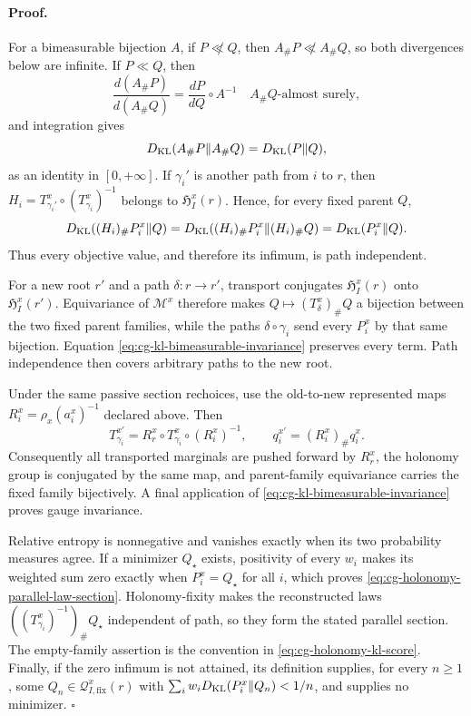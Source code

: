\paragraph{Proof.}
For a bimeasurable bijection \(A\), if \(P\not\ll Q\), then
\(A_\#P\not\ll A_\#Q\), so both divergences below are infinite. If
\(P\ll Q\), then
\begin{equation}
\frac{d(A_\#P)}{d(A_\#Q)}
=\frac{dP}{dQ}\circ A^{-1}
\quad A_\#Q\text{-almost surely},
\label{eq:cg-rn-bimeasurable}
\end{equation}
and integration gives
\begin{equation}
D_{\mathrm{KL}}(A_\#P\Vert A_\#Q)=D_{\mathrm{KL}}(P\Vert Q),
\label{eq:cg-kl-bimeasurable-invariance}
\end{equation}
as an identity in \([0,+\infty]\). If \(\gamma_i'\) is another path from
\(i\) to \(r\), then
\(H_i=T^x_{\gamma_i'}\circ(T^x_{\gamma_i})^{-1}\) belongs to
\(\mathfrak H_I^x(r)\). Hence, for every fixed parent \(Q\),
\begin{equation}
D_{\mathrm{KL}}((H_i)_\#P_i^x\Vert Q)
=D_{\mathrm{KL}}((H_i)_\#P_i^x\Vert(H_i)_\#Q)
=D_{\mathrm{KL}}(P_i^x\Vert Q).
\label{eq:cg-path-kl-invariance}
\end{equation}
Thus every objective value, and therefore its infimum, is path independent.

For a new root \(r'\) and a path \(\delta:r\to r'\), transport conjugates
\(\mathfrak H_I^x(r)\) onto \(\mathfrak H_I^x(r')\). Equivariance of
\(\mathscr M^x\) therefore makes
\(Q\mapsto(T^x_\delta)_\#Q\) a bijection between the two fixed parent
families, while the paths \(\delta\circ\gamma_i\) send every \(P_i^x\) by
that same bijection. Equation \eqref{eq:cg-kl-bimeasurable-invariance}
preserves every term. Path independence then covers arbitrary paths to the
new root.

Under the same passive section rechoices, use the old-to-new represented maps
\(R_i^x=\rho_x(a_i^x)^{-1}\) declared above.
Then
\begin{equation}
T_{\gamma_i}^{x\prime}
=R_r^x\circ T_{\gamma_i}^x\circ(R_i^x)^{-1},
\qquad
q_i^{x\prime}=(R_i^x)_\#q_i^x.
\label{eq:cg-law-gauge-rechoice}
\end{equation}
Consequently all transported marginals are pushed forward by
\(R_r^x\), the holonomy group is conjugated by the same map, and
parent-family equivariance carries the fixed family bijectively. A final
application of \eqref{eq:cg-kl-bimeasurable-invariance} proves gauge
invariance.

Relative entropy is nonnegative and vanishes exactly when its two probability
measures agree. If a minimizer \(Q_\star\) exists, positivity of every \(w_i\)
makes its weighted sum zero exactly when \(P_i^x=Q_\star\) for all \(i\),
which proves \eqref{eq:cg-holonomy-parallel-law-section}. Holonomy-fixity
makes the reconstructed laws
\(((T^x_{\gamma_i})^{-1})_\#Q_\star\) independent of path, so they form the
stated parallel section. The empty-family assertion is the convention in
\eqref{eq:cg-holonomy-kl-score}. Finally, if the zero infimum is not
attained, its definition supplies, for every \(n\geq1\), some
\(Q_n\in\mathscr Q_{I,\mathrm{fix}}^x(r)\) with
\(\sum_iw_iD_{\mathrm{KL}}(P_i^x\Vert Q_n)<1/n\), and supplies no minimizer. \(\square\)

